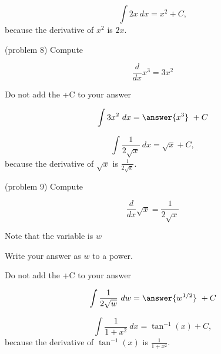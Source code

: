 \documentclass[handout]{ximera}
\begin{document}
\begin{example}[example 8]
\[
\int 2x \ dx = x^2 + C,
\]
because the derivative of $x^2$ is $2x$.

\end{example}


\begin{problem}(problem 8)
Compute 

\begin{hint}
\[
\frac{d}{dx} x^3 = 3x^2
\]
\end{hint}
\begin{hint}
\begin{center}
Do not add the +C to your answer
\end{center}
\end{hint}

\[
\int 3x^2 \ dx =
\answer{x^3} \ + C
\]
\end{problem}


\begin{example}[example 9]
\[
\int \frac{1}{2\sqrt x} \ dx = \sqrt x + C,
\]
because the derivative of $\sqrt x$ is $\frac{1}{2\sqrt x}$.

\end{example}



\begin{problem}(problem 9)
Compute 

\begin{hint}
\[
\frac{d}{dx} \sqrt x = \frac{1}{2\sqrt x}
\]
\end{hint}
\begin{hint}
Note that the variable is $w$
\end{hint}
\begin{hint}
Write your answer as $w$ to a power.
\end{hint}
\begin{hint}
\begin{center}
Do not add the +C to your answer
\end{center}
\end{hint}

\[
\int \frac{1}{2\sqrt w} \ dw =
\answer{w^{1/2}} \ + C
\]
\end{problem}



\begin{example}[example 10]
\[
\int \frac{1}{1 + x^2} \ dx = \tan^{-1}(x) + C,
\]
because the derivative 
of $\tan^{-1}(x)$ is $\frac{1}{1 + x^2}$.

\end{example}
\end{document}
